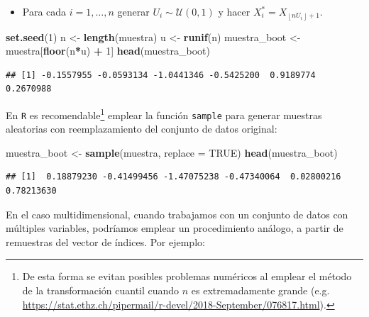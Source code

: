 \documentclass[]{book}
\newenvironment{Shaded}{\begin{snugshade}}{\end{snugshade}}
\newcommand{\KeywordTok}[1]{\textcolor[rgb]{0.13,0.29,0.53}{\textbf{#1}}}
\newcommand{\DataTypeTok}[1]{\textcolor[rgb]{0.13,0.29,0.53}{#1}}
\newcommand{\DecValTok}[1]{\textcolor[rgb]{0.00,0.00,0.81}{#1}}
\newcommand{\StringTok}[1]{\textcolor[rgb]{0.31,0.60,0.02}{#1}}
\newcommand{\OtherTok}[1]{\textcolor[rgb]{0.56,0.35,0.01}{#1}}
\newcommand{\OperatorTok}[1]{\textcolor[rgb]{0.81,0.36,0.00}{\textbf{#1}}}
\newcommand{\NormalTok}[1]{#1}
\providecommand{\tightlist}{%
  \setlength{\itemsep}{0pt}\setlength{\parskip}{0pt}}
\let\rmarkdownfootnote\footnote%
\def\footnote{\protect\rmarkdownfootnote}
\theoremstyle{definition}
\theoremstyle{definition}
\theoremstyle{definition}
\theoremstyle{remark}
\begin{document}
\begin{itemize}
\tightlist
\item
  Para cada \(i=1,\ldots ,n\) generar
  \(U_i\sim \mathcal{U}\left( 0,1 \right)\) y hacer
  \(X_i^{\ast}=X_{\left\lfloor nU_i\right\rfloor +1}\).
\end{itemize}

\begin{Shaded}
\begin{Highlighting}[]
\KeywordTok{set.seed}\NormalTok{(}\DecValTok{1}\NormalTok{)}
\NormalTok{n <-}\StringTok{ }\KeywordTok{length}\NormalTok{(muestra)}
\NormalTok{u <-}\StringTok{ }\KeywordTok{runif}\NormalTok{(n)}
\NormalTok{muestra_boot <-}\StringTok{ }\NormalTok{muestra[}\KeywordTok{floor}\NormalTok{(n}\OperatorTok{*}\NormalTok{u) }\OperatorTok{+}\StringTok{ }\DecValTok{1}\NormalTok{]}
\KeywordTok{head}\NormalTok{(muestra_boot)}
\end{Highlighting}
\end{Shaded}

\begin{verbatim}
## [1] -0.1557955 -0.0593134 -1.0441346 -0.5425200  0.9189774  0.2670988
\end{verbatim}

En \texttt{R} es recomendable\footnote{De esta forma se evitan posibles
  problemas numéricos al emplear el método de la transformación cuantil
  cuando \(n\) es extremadamente grande (e.g.
  \url{https://stat.ethz.ch/pipermail/r-devel/2018-September/076817.html}).}
emplear la función \texttt{sample} para generar muestras aleatorias con
reemplazamiento del conjunto de datos original:

\begin{Shaded}
\begin{Highlighting}[]
\NormalTok{muestra_boot <-}\StringTok{ }\KeywordTok{sample}\NormalTok{(muestra, }\DataTypeTok{replace =} \OtherTok{TRUE}\NormalTok{)}
\KeywordTok{head}\NormalTok{(muestra_boot)}
\end{Highlighting}
\end{Shaded}

\begin{verbatim}
## [1]  0.18879230 -0.41499456 -1.47075238 -0.47340064  0.02800216  0.78213630
\end{verbatim}

En el caso multidimensional, cuando trabajamos con un conjunto de datos
con múltiples variables, podríamos emplear un procedimiento análogo, a
partir de remuestras del vector de índices. Por ejemplo:
\end{document}
